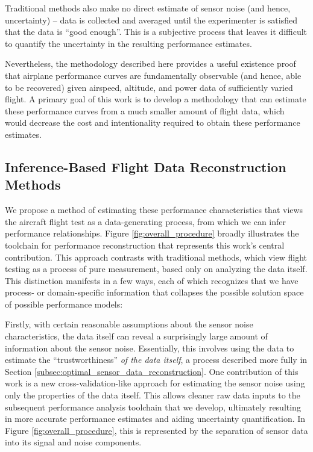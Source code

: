 \documentclass[conf]{new-aiaa}
\begin{document}
    Traditional methods also make no direct estimate of sensor noise (and hence, uncertainty) -- data is collected and averaged until the experimenter is satisfied that the data is ``good enough''. This is a subjective process that leaves it difficult to quantify the uncertainty in the resulting performance estimates.

    Nevertheless, the methodology described here provides a useful existence proof that airplane performance curves are fundamentally observable (and hence, able to be recovered) given airspeed, altitude, and power data of sufficiently varied flight. A primary goal of this work is to develop a methodology that can estimate these performance curves from a much smaller amount of flight data, which would decrease the cost and intentionality required to obtain these performance estimates.

    \subsection{Inference-Based Flight Data Reconstruction Methods}

    We propose a method of estimating these performance characteristics that views the aircraft flight test as a data-generating process, from which we can infer performance relationships. Figure \ref{fig:overall_procedure} broadly illustrates the toolchain for performance reconstruction that represents this work's central contribution. This approach contrasts with traditional methods, which view flight testing as a process of pure measurement, based only on analyzing the data itself. This distinction manifests in a few ways, each of which recognizes that we have process- or domain-specific information that collapses the possible solution space of possible performance models:

    Firstly, with certain reasonable assumptions about the sensor noise characteristics, the data itself can reveal a surprisingly large amount of information about the sensor noise. Essentially, this involves using the data to estimate the ``trustworthiness'' \emph{of the data itself}, a process described more fully in Section \ref{subsec:optimal_sensor_data_reconstruction}. One contribution of this work is a new cross-validation-like approach for estimating the sensor noise using only the properties of the data itself. This allows cleaner raw data inputs to the subsequent performance analysis toolchain that we develop, ultimately resulting in more accurate performance estimates and aiding uncertainty quantification. In Figure \ref{fig:overall_procedure}, this is represented by the separation of sensor data into its signal and noise components.
\end{document}
